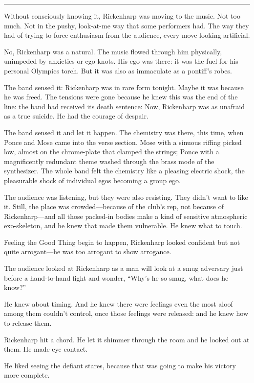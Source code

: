 \fancybreak{* * *}

Without consciously knowing it, Rickenharp was moving to the music. Not too much. Not in the pushy, look-at-me way that some performers had. The way they had of trying to force enthusiasm from the audience, every move looking artificial.

No, Rickenharp was a natural. The music flowed through him physically, unimpeded by anxieties or ego knots. His ego was there: it was the fuel for his personal Olympics torch. But it was also as immaculate as a pontiff's robes.

The band sensed it: Rickenharp was in rare form tonight. Maybe it was because he was freed. The tensions were gone because he knew this was the end of the line: the band had received its death sentence: Now, Rickenharp was as unafraid as a true suicide. He had the courage of despair.

The band sensed it and let it happen. The chemistry was there, this time, when Ponce and Mose came into the verse section. Mose with a sinuous riffing picked low, almost on the chrome-plate that clamped the strings; Ponce with a magnificently redundant theme washed through the brass mode of the synthesizer. The whole band felt the chemistry like a pleasing electric shock, the pleasurable shock of individual egos becoming a group ego.

The audience was listening, but they were also resisting. They didn't want to like it. Still, the place was crowded—because of the club's rep, not because of Rickenharp—and all those packed-in bodies make a kind of sensitive atmospheric exo-skeleton, and he knew that made them vulnerable. He knew what to touch.

Feeling the Good Thing begin to happen, Rickenharp looked confident but not quite arrogant—he was too arrogant to show arrogance.

The audience looked at Rickenharp as a man will look at a smug adversary just before a hand-to-hand fight and wonder, ``Why's he so smug, what does he know?''

He knew about timing. And he knew there were feelings even the most aloof among them couldn't control, once those feelings were released: and he knew how to release them.

Rickenharp hit a chord. He let it shimmer through the room and he looked out at them. He made eye contact.

He liked seeing the defiant stares, because that was going to make his victory more complete.

